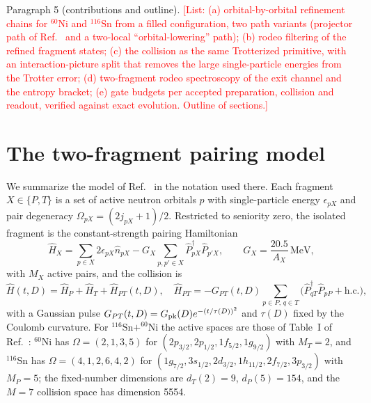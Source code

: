 \documentclass[
  aps,
  prc,
  reprint,
  superscriptaddress,
  floatfix,
  nofootinbib
]{revtex4-2}
\newcommand{\todo}[1]{\textcolor{red}{[#1]}}
\newcommand{\HP}{\hat H_{P}}
\newcommand{\HT}{\hat H_{T}}
\newcommand{\HPT}{\hat H_{PT}}
\newcommand{\Sn}{^{116}\mathrm{Sn}}
\newcommand{\Ni}{^{60}\mathrm{Ni}}
\begin{document}
Paragraph 5 (contributions and outline).  \todo{List: (a) orbital-by-orbital
refinement chains for $\Ni$ and $\Sn$ from a filled configuration, two path
variants (projector path of Ref.~\cite{EigenQPairing2026} and a two-local
``orbital-lowering'' path); (b) rodeo filtering of the refined fragment
states; (c) the collision as the same Trotterized primitive, with an
interaction-picture split that removes the large single-particle energies
from the Trotter error; (d) two-fragment rodeo spectroscopy of the exit
channel and the entropy bracket; (e) gate budgets per accepted preparation,
collision and readout, verified against exact evolution.  Outline of
sections.}

\section{The two-fragment pairing model}
\label{sec:model}
We summarize the model of Ref.~\cite{TwoFragment2026} in the notation used
there.  Each fragment $X\in\{P,T\}$ is a set of active neutron orbitals $p$
with single-particle energy $\epsilon_{pX}$ and pair degeneracy
$\Omega_{pX}=(2j_{pX}+1)/2$.  Restricted to seniority zero, the isolated
fragment is the constant-strength pairing Hamiltonian
\begin{equation}
  \hat H_X=\sum_{p\in X}2\epsilon_{pX}\hat n_{pX}
  -G_X\sum_{p,p'\in X}\hat P^\dagger_{pX}\hat P_{p'X},
  \qquad G_X=\frac{20.5}{A_X}\,\mathrm{MeV},
  \label{eq:HX}
\end{equation}
with $M_X$ active pairs, and the collision is
\begin{equation}
  \hat H(t,D)=\HP+\HT+\HPT(t,D),\quad
  \HPT=-G_{PT}(t,D)\sum_{p\in P,\,q\in T}
  \big(\hat P^\dagger_{qT}\hat P_{pP}+\mathrm{h.c.}\big),
  \label{eq:Hcoll}
\end{equation}
with a Gaussian pulse $G_{PT}(t,D)=G_{\rm pk}(D)e^{-(t/\tau(D))^2}$ and
$\tau(D)$ fixed by the Coulomb curvature.  For $\Sn+\Ni$ the active spaces
are those of Table~I of Ref.~\cite{TwoFragment2026}: $\Ni$ has
$\Omega=(2,1,3,5)$ for $(2p_{3/2},2p_{1/2},1f_{5/2},1g_{9/2})$ with $M_T=2$,
and $\Sn$ has $\Omega=(4,1,2,6,4,2)$ for
$(1g_{7/2},3s_{1/2},2d_{3/2},1h_{11/2},2f_{7/2},3p_{3/2})$ with $M_P=5$; the
fixed-number dimensions are $d_T(2)=9$, $d_P(5)=154$, and the $M=7$ collision
space has dimension 5554.
\end{document}
